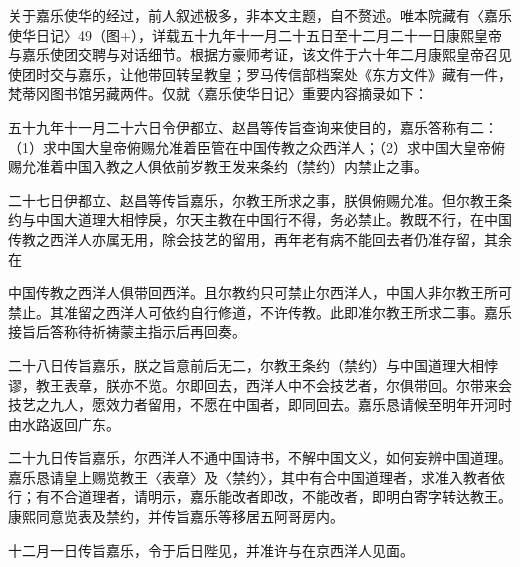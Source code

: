 
\noindent 关于嘉乐使华的经过，前人叙述极多，非本文主题，自不赘述。唯本院藏有〈嘉乐使华日记〉49（图+），详载五十九年十一月二十五日至十二月二十一日康熙皇帝与嘉乐使团交聘与对话细节。根据方豪师考证，该文件于六十年二月康熙皇帝召见使团时交与嘉乐，让他带回转呈教皇；罗马传信部档案处《东方文件》藏有一件，梵蒂冈图书馆另藏两件。仅就〈嘉乐使华日记〉重要内容摘录如下：

\vfill
\begin{BookNotes}
\end{BookNotes}



\noindent 五十九年十一月二十六日令伊都立、赵昌等传旨查询来使目的，嘉乐答称有二：（1）求中国大皇帝俯赐允准着臣管在中国传教之众西洋人；（2）求中国大皇帝俯赐允准着中国入教之人俱依前岁教王发来条约（禁约）内禁止之事。

二十七日伊都立、赵昌等传旨嘉乐，尔教王所求之事，朕俱俯赐允准。但尔教王条约与中国大道理大相悖戾，尔天主教在中国行不得，务必禁止。教既不行，在中国传教之西洋人亦属无用，除会技艺的留用，再年老有病不能回去者仍准存留，其余在



\noindent 中国传教之西洋人俱带回西洋。且尔教约只可禁止尔西洋人，中国人非尔教王所可禁止。其准留之西洋人可依约自行修道，不许传教。此即准尔教王所求二事。嘉乐接旨后答称待祈祷蒙主指示后再回奏。

二十八日传旨嘉乐，朕之旨意前后无二，尔教王条约（禁约）与中国道理大相悖谬，教王表章，朕亦不览。尔即回去，西洋人中不会技艺者，尔俱带回。尔带来会技艺之九人，愿效力者留用，不愿在中国者，即同回去。嘉乐恳请候至明年开河时由水路返回广东。

二十九日传旨嘉乐，尔西洋人不通中国诗书，不解中国文义，如何妄辨中国道理。嘉乐恳请皇上赐览教王〈表章〉及〈禁约〉，其中有合中国道理者，求准入教者依行；有不合道理者，请明示，嘉乐能改者即改，不能改者，即明白寄字转达教王。康熙同意览表及禁约，并传旨嘉乐等移居五阿哥房内。

十二月一日传旨嘉乐，令于后日陛见，并准许与在京西洋人见面。

